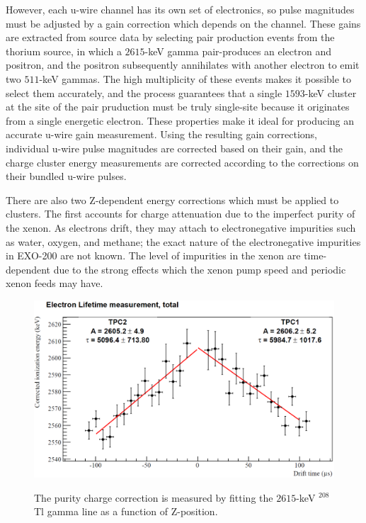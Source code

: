 However, each u-wire channel has its own set of electronics, so pulse magnitudes must be adjusted by a gain correction which depends on the channel.  These gains are extracted from source data by selecting pair production events from the thorium source, in which a $2615$-keV gamma pair-produces an electron and positron, and the positron subsequently annihilates with another electron to emit two $511$-keV gammas.  The high multiplicity of these events makes it possible to select them accurately, and the process guarantees that a single $1593$-keV cluster at the site of the pair pruduction must be truly single-site because it originates from a single energetic electron.  These properties make it ideal for producing an accurate u-wire gain measurement.  Using the resulting gain corrections, individual u-wire pulse magnitudes are corrected based on their gain, and the charge cluster energy measurements are corrected according to the corrections on their bundled u-wire pulses.~\cite{EnergyDocumentRun2a}

There are also two Z-dependent energy corrections which must be applied to clusters.  The first accounts for charge attenuation due to the imperfect purity of the xenon.  As electrons drift, they may attach to electronegative impurities such as water, oxygen, and methane; the exact nature of the electronegative impurities in EXO-200 are not known.  The level of impurities in the xenon are time-dependent due to the strong effects which the xenon pump speed and periodic xenon feeds may have.

\begin{figure}
\begin{center}
\includegraphics[keepaspectratio=true,width=\textwidth]{LongThPurityMeasurement.png}
\end{center}
\renewcommand{\baselinestretch}{1}
\small\normalsize
\begin{quote}
\caption{The purity charge correction is measured by fitting the $2615$-keV $^{208}$Tl gamma line as a function of Z-position.~\cite{EnergyDocumentRun2ab}}
\label{fig:ThPurityMeasurement}
\end{quote}
\end{figure}
\renewcommand{\baselinestretch}{2}
\small\normalsize

